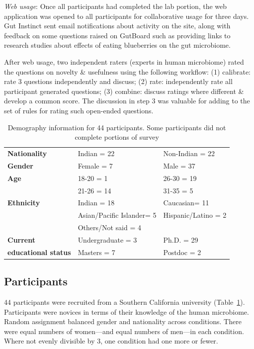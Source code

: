 \textit{Web usage}: Once all participants had completed the lab portion, the web application was opened to all participants for collaborative usage for three days. Gut Instinct sent email notifications about activity on the site, along with feedback on some questions raised on GutBoard such as providing links to research studies about effects of eating blueberries on the gut microbiome. 

After web usage, two independent raters (experts in human microbiome) rated the questions on novelty \& usefulness using the following workflow: (1) calibrate: rate 3 questions independently and discuss; (2) rate: independently rate all participant generated questions; (3) combine: discuss ratings where different \& develop a common score. The discussion in step 3 was valuable for adding to the set of rules for rating such open-ended questions. 

\vspace{0.25in}
\begin{table}[!ht]
\caption[Demography information for 44 participants]{Demography information for 44 participants. Some participants did not complete portions of survey}

\vspace{-0.25in}
\begin{center}
\renewcommand{\arraystretch}{1.5} %
\begin{tabular}{>{\bf}p{1.5in}p{1.5in}p{1.5in}}
\hline
Nationality	&	Indian = 22	&	Non-Indian = 22\\
Gender		&	Female = 7	&	Male = 37\\
Age			&	18-20 = 1		& 	26-30 = 19\\
			&	21-26 = 14	&	31-35 = 5\\
Ethnicity		&	Indian = 18	& 	Caucasian= 11\\
			&	Asian/Pacific Islander= 5	&	Hispanic/Latino = 2\\
			&	Others/Not said = 4	 &				\\
Current		& 	Undergraduate = 3	& Ph.D. = 29\\
 educational status 	&	Masters = 7	&	Postdoc = 2\\
\hline
\end{tabular}
\end{center}
\label{tab:gi-demo}
\end{table}

\subsection*{Participants}
44 participants were recruited from a Southern California university (Table~\ref{tab:gi-demo}). Participants were novices in terms of their knowledge of the human microbiome. Random assignment balanced gender and nationality across conditions. There were equal numbers of women---and equal numbers of men---in each condition. Where not evenly divisible by 3, one condition had one more or fewer. 

